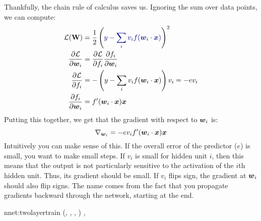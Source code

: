 Thankfully, the chain rule of calculus saves us.  Ignoring the sum
over data points, we can compute:
%
\begin{align}
\cL(\mat W) &=
\frac 1 2 \left( \textcolor{darkblue}{y -
     \sum_i v_i f(\dotp{\vec w_i}{\vx})}
     \right)^2
\\
\frac {\partial \cL} {\partial \vec w_i}
&= \frac {\partial \cL} {\partial f_i}
   \frac {\partial f_i}   {\partial \vec w_i}
\\
\frac {\partial \cL} {\partial f_i}
&= -\left(y - \sum_i v_i f(\dotp{\vec w_i}{\vx})\right) v_i
= -e v_i
\\
\frac {\partial f_i} {\partial \vec w_i}
&= f'(\dotp{\vec w_i}{\vx}) \vx
\end{align}
%
Putting this together, we get that the gradient with respect to
${\boldsymbol{w}}_i$ is:
%
\begin{equation}
\nabla_{{\boldsymbol{w}}_i}
= -e v_i f'({\boldsymbol{w}}_i \cdot {\boldsymbol{x}}) \boldsymbol{x}
\end{equation}
%
Intuitively you can make sense of this.  If the overall error of the
predictor ($e$) is small, you want to make small steps.  If $v_i$ is
small for hidden unit $i$, then this means that the output is not
particularly sensitive to the activation of the $i$th hidden unit.
Thus, its gradient should be small.  If $v_i$ flips sign, the gradient
at ${\boldsymbol{w}}_i$ should also flip signs.  The name
 comes from the fact that you propagate
gradients backward through the network, starting at the end.

\newalgorithm%
  {nnet:twolayertrain}%
  {(, \VAR{$\eta$}, , )}
  {
\ENDFOR
{}
\ENDFOR
\ENDFOR
{}
\ENDFOR
\RETURN {}, 
}

